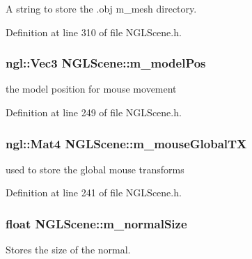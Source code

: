 A string to store the .obj m\-\_\-mesh directory. 



Definition at line 310 of file N\-G\-L\-Scene.\-h.

\subsubsection[{m\-\_\-model\-Pos}]{\setlength{\rightskip}{0pt plus 5cm}ngl\-::\-Vec3 N\-G\-L\-Scene\-::m\-\_\-model\-Pos\hspace{0.3cm}{\ttfamily [private]}}\label{class_n_g_l_scene_aafe232ffe5c4f03ea3095665d91c2ab3}


the model position for mouse movement 



Definition at line 249 of file N\-G\-L\-Scene.\-h.

\subsubsection[{m\-\_\-mouse\-Global\-T\-X}]{\setlength{\rightskip}{0pt plus 5cm}ngl\-::\-Mat4 N\-G\-L\-Scene\-::m\-\_\-mouse\-Global\-T\-X\hspace{0.3cm}{\ttfamily [private]}}\label{class_n_g_l_scene_a205162fdc65f45b4a4d956fdc60e8a4d}


used to store the global mouse transforms 



Definition at line 241 of file N\-G\-L\-Scene.\-h.

\subsubsection[{m\-\_\-normal\-Size}]{\setlength{\rightskip}{0pt plus 5cm}float N\-G\-L\-Scene\-::m\-\_\-normal\-Size\hspace{0.3cm}{\ttfamily [private]}}\label{class_n_g_l_scene_ae297e9f420ecb154eae3d08e5a413536}


Stores the size of the normal. 



